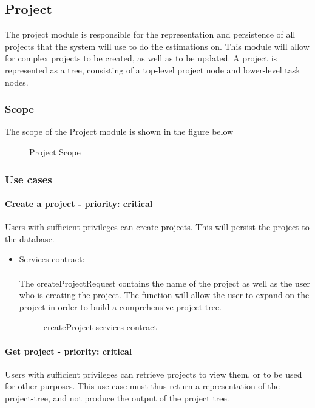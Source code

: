 \subsection{Project}
The project module is responsible for the representation and persistence of all projects that the system will use to do the estimations on. This module will allow for complex projects to be created, as well as to be updated. A project is represented as a tree, consisting of a top-level project node and lower-level task nodes.

\subsubsection{Scope}
The scope of the Project module is shown in the figure below
	\begin{figure}[H]
	    	\centering
	    	\caption{Project Scope}
	    	\label{fig:Project_Scope}
   	\end{figure}
\subsubsection{Use cases}

\paragraph{Create a project - priority: critical}
Users with sufficient privileges can create projects. This will persist the project to the database.

\begin{itemize}
	\item Services contract:\\ \\
	The createProjectRequest contains the name of the project as well as the user who is creating the project. The function will allow the user to expand on the project in order to build a comprehensive project tree.
	\begin{figure}[H]
    	\centering
    	\caption{createProject services contract}
    	\label{fig:createProject_services_contract}
   	\end{figure}
\end{itemize}

\paragraph{Get project - priority: critical}
Users with sufficient privileges can retrieve projects to view them, or to be used for other purposes. This use case must thus return a representation of the project-tree, and not produce the output of the project tree.

